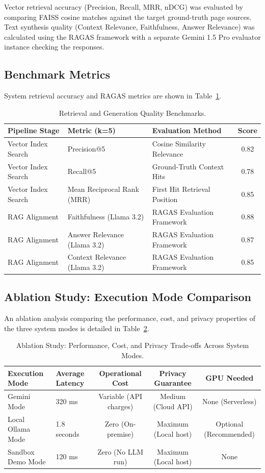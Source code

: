 \documentclass[11pt,journal,onecolumn]{article}
\begin{document}
Vector retrieval accuracy (Precision, Recall, MRR, nDCG) was evaluated by comparing FAISS cosine matches against the target ground-truth page sources. Text synthesis quality (Context Relevance, Faithfulness, Answer Relevance) was calculated using the RAGAS framework \cite{es2023ragas} with a separate Gemini 1.5 Pro evaluator instance checking the responses.

\subsection{Benchmark Metrics}
System retrieval accuracy and RAGAS metrics are shown in Table~\ref{tab:metrics}.

\begin{table}[H]
\centering
\begin{tabular}{@{}lllc@{}}
\toprule
\textbf{Pipeline Stage} & \textbf{Metric (k=5)} & \textbf{Evaluation Method} & \textbf{Score} \\ \midrule
Vector Index Search & Precision@5 & Cosine Similarity Relevance & 0.82 \\
Vector Index Search & Recall@5 & Ground-Truth Context Hits & 0.78 \\
Vector Index Search & Mean Reciprocal Rank (MRR) & First Hit Retrieval Position & 0.85 \\
RAG Alignment & Faithfulness (Llama 3.2) & RAGAS Evaluation Framework & 0.88 \\
RAG Alignment & Answer Relevance (Llama 3.2) & RAGAS Evaluation Framework & 0.87 \\
RAG Alignment & Context Relevance (Llama 3.2) & RAGAS Evaluation Framework & 0.85 \\ \bottomrule
\end{tabular}
\caption{Retrieval and Generation Quality Benchmarks.}
\label{tab:metrics}
\end{table}

\subsection{Ablation Study: Execution Mode Comparison}
An ablation analysis comparing the performance, cost, and privacy properties of the three system modes is detailed in Table~\ref{tab:ablation}.

\begin{table}[H]
\centering
\begin{tabular}{@{}llccc@{}}
\toprule
\textbf{Execution Mode} & \textbf{Average Latency} & \textbf{Operational Cost} & \textbf{Privacy Guarantee} & \textbf{GPU Needed} \\ \midrule
Gemini Mode & 320 ms & Variable (API charges) & Medium (Cloud API) & None (Serverless) \\
Local Ollama Mode & 1.8 seconds & Zero (On-premise) & Maximum (Local host) & Optional (Recommended) \\
Sandbox Demo Mode & 120 ms & Zero (No LLM run) & Maximum (Local host) & None \\ \bottomrule
\end{tabular}
\caption{Ablation Study: Performance, Cost, and Privacy Trade-offs Across System Modes.}
\label{tab:ablation}
\end{table}
\end{document}
